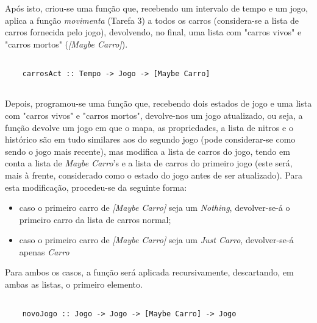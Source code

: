 \documentclass[a4paper]{report} %
\begin{document}
  \par \noindent Após isto, criou-se uma função que, recebendo um intervalo de tempo e um jogo, aplica a função \textit{movimenta} (Tarefa 3) a todos os carros (considera-se a lista de carros fornecida pelo jogo), devolvendo, no final, uma lista com "carros vivos" e "carros mortos" (\textit{[Maybe Carro]}).
  
  \begin{verbatim}
      
    carrosAct :: Tempo -> Jogo -> [Maybe Carro]
      
  \end{verbatim}
  
  \par \noindent Depois, programou-se uma função que, recebendo dois estados de jogo e uma lista com "carros vivos" e "carros mortos", devolve-nos um jogo atualizado, ou seja, a função devolve um jogo em que o mapa, as propriedades, a lista de nitros e o histórico são em tudo similares aos do segundo jogo (pode considerar-se como sendo o jogo mais recente), mas modifica a lista de carros do jogo, tendo em conta a lista de \textit{Maybe Carro}'s e a lista de carros do primeiro jogo (este será, mais à frente, considerado como o estado do jogo antes de ser atualizado). Para esta modificação, procedeu-se da seguinte forma:
  
  \begin{itemize}
      
      \item caso o primeiro carro de \textit{[Maybe Carro]} seja um \textit{Nothing}, devolver-se-á o primeiro carro da lista de carros normal;
      
      \item caso o primeiro carro de \textit{[Maybe Carro]} seja um \textit{Just Carro}, devolver-se-á apenas \textit{Carro}
      
  \end{itemize}
  
  \par \noindent Para ambos os casos, a função será aplicada recursivamente, descartando, em ambas as listas, o primeiro elemento.
  
  \begin{verbatim}
      
    novoJogo :: Jogo -> Jogo -> [Maybe Carro] -> Jogo  
      
  \end{verbatim}
  
  \newpage
  
\end{document}

